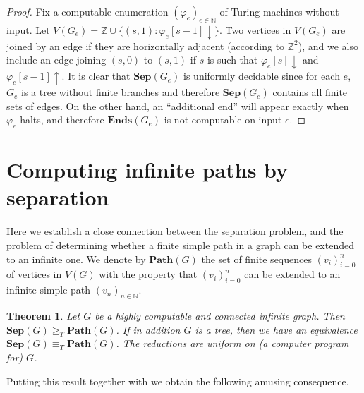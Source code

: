 \documentclass[10pt,A4]{amsart}
\newtheorem{thm}{Theorem}[section]
\theoremstyle{definition}
\newtheorem{defn}[thm]{Definition}
\theoremstyle{definition}
\newcommand{\N}{\mathbb{N}}
\newcommand{\Z}{\mathbb{Z}}
\newcommand{\sep}[1]{\mathbf{Sep}({#1})}
\newcommand{\Ends}[1]{\mathbf{Ends}({#1})}
\newcommand{\Path}[1]{\mathbf{Path}({#1})}
\renewcommand{\mid}{ : }
\begin{document}
\begin{proof} Fix a computable enumeration $(\varphi_e)_{e \in \N}$ of Turing machines without input. Let $V(G_e) = \Z \cup \{(s,1) \mid \varphi_{e}[s-1] \downarrow \}$. Two vertices in $V(G_e)$ are joined by an edge if they are horizontally adjacent (according to $\Z^2$), and we also include an edge joining $(s,0)$ to $(s,1)$ if $s$ is such that $\varphi_{e}[s]\downarrow$ and  $\varphi_{e}[s-1]\uparrow$. It is clear that $\sep{G_e}$ is uniformly decidable since  for each $e$, $G_e$ is a tree without finite branches and therefore $\sep{G_e}$ contains all finite sets of edges. On the other hand, an ``additional end'' will appear exactly when $\varphi_e$ halts, and therefore $\Ends{G_e}$ is not computable on input $e$. 
\end{proof}
\section{Computing infinite paths by separation}\label{sec:infinite-paths}

Here we establish a close connection between the separation problem, and the problem of determining whether a finite simple path in a graph can be extended to an infinite one. We  denote by $\Path{G}$ the set of finite sequences  $(v_i)_{i=0}^{n}$ of vertices in $V(G)$ with the property that $(v_i)_{i=0}^{n}$ can be extended to an infinite simple path $(v_n)_{n\in\N}$. 






\begin{thm}
\label{thm:sep-vs-path}Let $G$ be a highly computable and connected infinite 
graph. Then $\sep{G}\geq_{T}\Path{G}$. If in addition $G$ is a tree, then
we have an equivalence $\sep{G}\equiv_{T}\Path{G}$. The reductions
are uniform on (a computer program for) $G$. 
\end{thm}
Putting this result together with  we obtain the following amusing consequence. 
\end{document}
